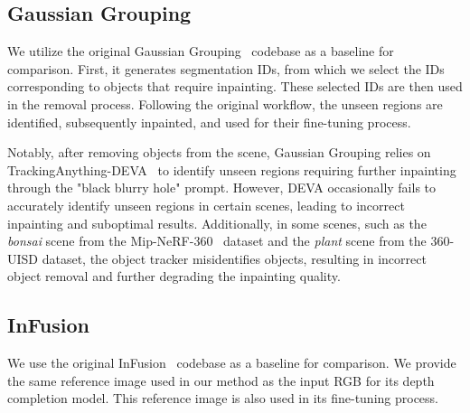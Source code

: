 \subsection{Gaussian Grouping~\cite{wang2024gscream}}

We utilize the original Gaussian Grouping~\cite{ye2023gaussian} codebase as a baseline for comparison. First, it generates segmentation IDs, from which we select the IDs corresponding to objects that require inpainting. These selected IDs are then used in the removal process. Following the original workflow, the unseen regions are identified, subsequently inpainted, and used for their fine-tuning process.

Notably, after removing objects from the scene, Gaussian Grouping relies on TrackingAnything-DEVA~\cite{cheng2023tracking} to identify unseen regions requiring further inpainting through the "black blurry hole" prompt. However, DEVA occasionally fails to accurately identify unseen regions in certain scenes, leading to incorrect inpainting and suboptimal results. Additionally, in some scenes, such as the \textit{bonsai} scene from the Mip-NeRF-360~\cite{barron2022mip} dataset and the \textit{plant} scene from the 360-UISD dataset, the object tracker misidentifies objects, resulting in incorrect object removal and further degrading the inpainting quality.



\subsection{InFusion~\cite{liu2024infusion}}
We use the original InFusion~\cite{liu2024infusion} codebase as a baseline for comparison. We provide the same reference image used in our method as the input RGB for its depth completion model. This reference image is also used in its fine-tuning process.


